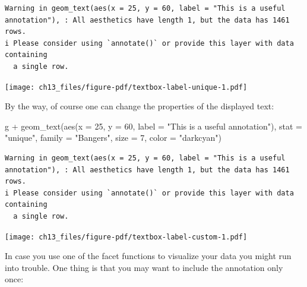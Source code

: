 \documentclass[
  letterpaper,
]{scrbook}
\newenvironment{Shaded}{\begin{snugshade}}{\end{snugshade}}
\newcommand{\AttributeTok}[1]{\textcolor[rgb]{0.40,0.45,0.13}{#1}}
\newcommand{\DecValTok}[1]{\textcolor[rgb]{0.68,0.00,0.00}{#1}}
\newcommand{\FunctionTok}[1]{\textcolor[rgb]{0.28,0.35,0.67}{#1}}
\newcommand{\NormalTok}[1]{\textcolor[rgb]{0.00,0.23,0.31}{#1}}
\newcommand{\SpecialCharTok}[1]{\textcolor[rgb]{0.37,0.37,0.37}{#1}}
\newcommand{\StringTok}[1]{\textcolor[rgb]{0.13,0.47,0.30}{#1}}
\begin{document}
\begin{verbatim}
Warning in geom_text(aes(x = 25, y = 60, label = "This is a useful annotation"), : All aesthetics have length 1, but the data has 1461 rows.
i Please consider using `annotate()` or provide this layer with data containing
  a single row.
\end{verbatim}

\texttt{[image: ch13\_files/figure-pdf/textbox-label-unique-1.pdf]}

By the way, of course one can change the properties of the displayed
text:

\begin{Shaded}
\begin{Highlighting}[]
\NormalTok{g }\SpecialCharTok{+}
  \FunctionTok{geom\_text}\NormalTok{(}\FunctionTok{aes}\NormalTok{(}\AttributeTok{x =} \DecValTok{25}\NormalTok{, }\AttributeTok{y =} \DecValTok{60}\NormalTok{,}
                \AttributeTok{label =} \StringTok{"This is a useful annotation"}\NormalTok{),}
            \AttributeTok{stat =} \StringTok{"unique"}\NormalTok{, }\AttributeTok{family =} \StringTok{"Bangers"}\NormalTok{,}
            \AttributeTok{size =} \DecValTok{7}\NormalTok{, }\AttributeTok{color =} \StringTok{"darkcyan"}\NormalTok{)}
\end{Highlighting}
\end{Shaded}

\begin{verbatim}
Warning in geom_text(aes(x = 25, y = 60, label = "This is a useful annotation"), : All aesthetics have length 1, but the data has 1461 rows.
i Please consider using `annotate()` or provide this layer with data containing
  a single row.
\end{verbatim}

\texttt{[image: ch13\_files/figure-pdf/textbox-label-custom-1.pdf]}

In case you use one of the facet functions to visualize your data you
might run into trouble. One thing is that you may want to include the
annotation only once:
\end{document}
